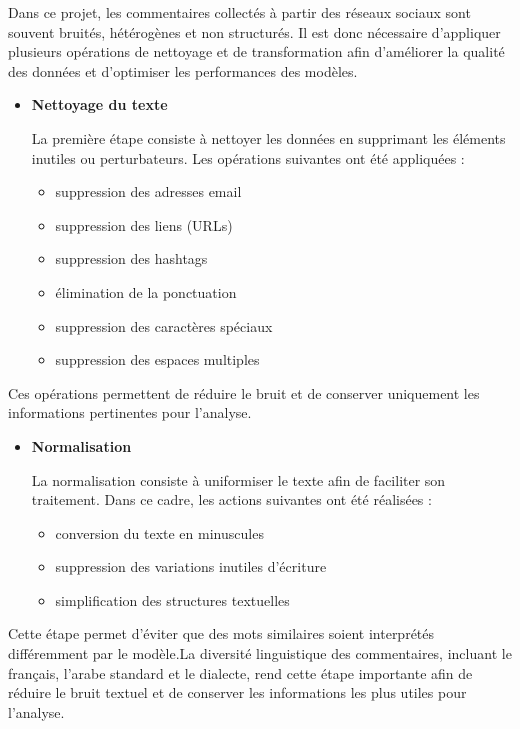 \documentclass[12pt,a4paper,oneside]{report}
\begin{document}
Dans ce projet, les commentaires collectés à partir des réseaux sociaux sont souvent bruités, hétérogènes et non structurés. Il est donc nécessaire d’appliquer plusieurs opérations de nettoyage et de transformation afin d’améliorer la qualité des données et d’optimiser les performances des modèles.

\begin{itemize}
    \item \textbf{Nettoyage du texte}

La première étape consiste à nettoyer les données en supprimant les éléments inutiles ou perturbateurs. Les opérations suivantes ont été appliquées :

\begin{itemize}
    \item suppression des adresses email
    \item suppression des liens (URLs)
    \item suppression des hashtags
    \item élimination de la ponctuation
    \item suppression des caractères spéciaux
    \item suppression des espaces multiples
\end{itemize}
\end{itemize}
Ces opérations permettent de réduire le bruit et de conserver uniquement les informations pertinentes pour l’analyse.

\begin{itemize}
    \item \textbf{Normalisation}

La normalisation consiste à uniformiser le texte afin de faciliter son traitement. Dans ce cadre, les actions suivantes ont été réalisées :

\begin{itemize}
    \item conversion du texte en minuscules
    \item suppression des variations inutiles d’écriture
    \item simplification des structures textuelles
\end{itemize}
\end{itemize}
Cette étape permet d’éviter que des mots similaires soient interprétés différemment par le modèle.La diversité linguistique des commentaires, incluant le français, l’arabe standard et le dialecte, rend cette étape importante afin de réduire le bruit textuel et de conserver les informations les plus utiles pour l’analyse.
\end{document}
